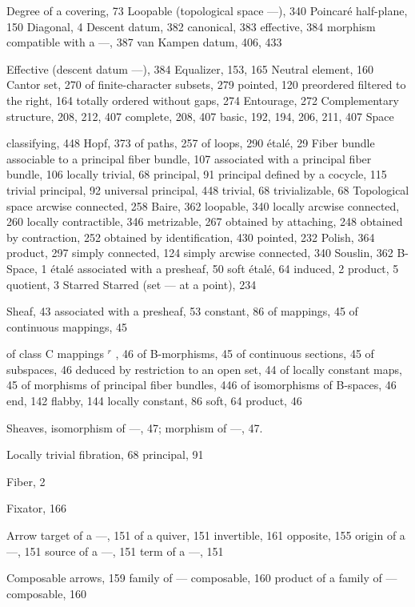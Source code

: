 
Degree of a covering, 73 Loopable (topological space ---), 340 Poincaré half-plane, 150 Diagonal, 4 Descent datum, 382 canonical, 383 effective, 384 morphism compatible with a ---, 387 van Kampen datum, 406, 433


Effective (descent datum ---), 384 Equalizer, 153, 165 Neutral element, 160 Cantor set, 270 of finite-character subsets, 279 pointed, 120 preordered filtered to the right, 164 totally ordered without gaps, 274 Entourage, 272 Complementary structure, 208, 212, 407 complete, 208, 407 basic, 192, 194, 206, 211, 407 Space

classifying, 448 Hopf, 373 of paths, 257 of loops, 290 étalé, 29 Fiber bundle associable to a principal fiber bundle, 107 associated with a principal fiber bundle, 106 locally trivial, 68 principal, 91 principal defined by a cocycle, 115 trivial principal, 92 universal principal, 448 trivial, 68 trivializable, 68 Topological space arcwise connected, 258 Baire, 362 loopable, 340 locally arcwise connected, 260 locally contractible, 346 metrizable, 267 obtained by attaching, 248 obtained by contraction, 252 obtained by identification, 430 pointed, 232 Polish, 364 product, 297 simply connected, 124 simply arcwise connected, 340 Souslin, 362 B-Space, 1 étalé associated with a presheaf, 50 soft étalé, 64 induced, 2 product, 5 quotient, 3 Starred Starred (set --- at a point), 234


Sheaf, 43 associated with a presheaf, 53 constant, 86 of mappings, 45 of continuous mappings, 45

of class C mappings \(^{r}\) , 46 of B-morphisms, 45 of continuous sections, 45 of subspaces, 46 deduced by restriction to an open set, 44 of locally constant maps, 45 of morphisms of principal fiber bundles, 446 of isomorphisms of B-spaces, 46 end, 142 flabby, 144 locally constant, 86 soft, 64 product, 46

Sheaves, isomorphism of ---, 47; morphism of ---, 47.

Locally trivial fibration, 68 principal, 91

Fiber, 2

Fixator, 166

Arrow target of a ---, 151 of a quiver, 151 invertible, 161 opposite, 155 origin of a ---, 151 source of a ---, 151 term of a ---, 151

Composable arrows, 159 family of --- composable, 160 product of a family of --- composable, 160


